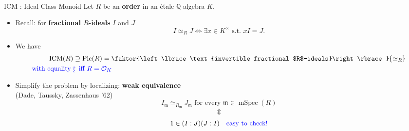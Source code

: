 \documentclass[usenames,dvipsnames,handout]{beamer}
\def\Q{\mathbb{Q}}
\DeclareMathOperator{\ICM}{ICM}
\DeclareMathOperator{\Pic}{Pic}
\DeclareMathOperator{\mSpec}{mSpec}
\newcommand{\cO}{{\mathcal O}}
\renewcommand{\frm}{{\mathfrak m}}
\newcommand{\frf}{{\mathfrak f}}
\newcommand{\set}[1]{\left\lbrace#1\right\rbrace }
\newcommand{\blue}[1]{\textcolor{blue}{#1}}
\begin{document}
\begin{frame}{ICM : Ideal Class Monoid}
    Let $R$ be an {\bf order} in an \'etale  $\Q$-algebra $K$.
    \begin{itemize}
\pause
    \item Recall: for {\bf fractional $R$-ideals} $I$ and $J$
	 \[ I\simeq_R J \Longleftrightarrow \exists x \in K^\times \text{ s.t.~} xI=J. \]
\pause
    \item \vspace*{-1em}
    We have
   	\begin{align*}
    \ICM(R) & \supseteq \Pic(R)=\faktor{\set{\text{invertible fractional $R$-ideals}}}{\simeq_R} \\
	\blue{\text{with equality }} & \blue{\rotatebox[origin=c]{90}{$\large\rightsquigarrow$}\mkern2mu \text{ iff } R=\cO_K }
    \end{align*}
\pause
    \item \vspace*{-1em}
    Simplify the problem by localizing: \textbf{weak equivalence}\\ (Dade, Taussky, Zassenhaus '62)
    \[I_{\frm}\simeq_{R_{\frm}} J_{\frm} \text{ for every } {\frm} \in \mSpec(R)\]
\pause
    \vspace{-6mm}\[\Updownarrow\]
    \[1\in (I:J)(J:I)\quad \textcolor{blue}{\text{easy to check!}}\]
\end{itemize}
\end{frame}

\end{document}
